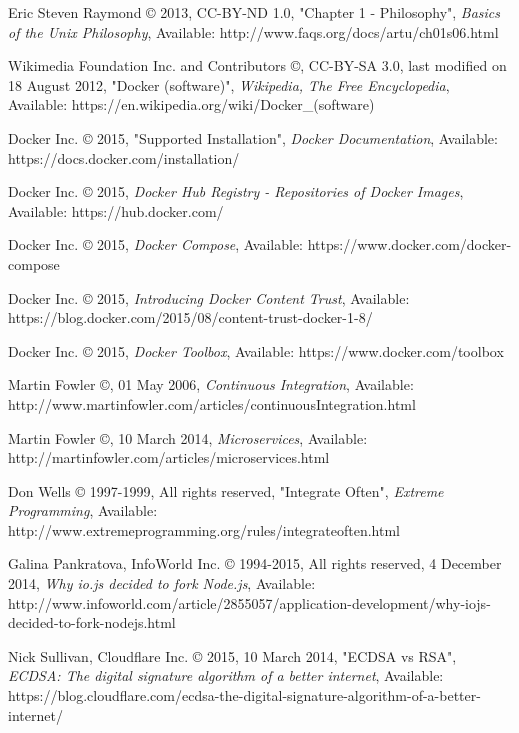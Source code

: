 \begin{thebibliography}{999}

\raggedright
Eric Steven Raymond © 2013, CC-BY-ND 1.0, "Chapter 1 - Philosophy",
{\em Basics of the Unix Philosophy},
Available: http://www.faqs.org/docs/artu/ch01s06.html

\raggedright
Wikimedia Foundation Inc. and Contributors ©, CC-BY-SA 3.0,
last modified on 18 August 2012, "Docker (software)",
{\em Wikipedia, The Free Encyclopedia},
Available: https://en.wikipedia.org/wiki/Docker\_(software)

Docker Inc. © 2015, "Supported Installation",
{\em Docker Documentation},
Available: https://docs.docker.com/installation/

Docker Inc. © 2015,
{\em Docker Hub Registry - Repositories of Docker Images},
Available: https://hub.docker.com/

\raggedright
Docker Inc. © 2015,
{\em Docker Compose},
Available: https://www.docker.com/docker-compose

\raggedright
Docker Inc. © 2015,
{\em Introducing Docker Content Trust},
Available: https://blog.docker.com/2015/08/content-trust-docker-1-8/

\raggedright
Docker Inc. © 2015,
{\em Docker Toolbox},
Available: https://www.docker.com/toolbox

\raggedright
Martin Fowler ©, 01 May 2006,
{\em Continuous Integration},
Available: http://www.martinfowler.com/articles/continuousIntegration.html

\raggedright
Martin Fowler ©, 10 March 2014,
{\em Microservices},
Available: http://martinfowler.com/articles/microservices.html

\raggedright
Don Wells © 1997-1999, All rights reserved, "Integrate Often",
{\em Extreme Programming},
Available: http://www.extremeprogramming.org/rules/integrateoften.html

\raggedright
Galina Pankratova, InfoWorld Inc. © 1994-2015, All rights reserved, 4 December 2014,
{\em Why io.js decided to fork Node.js},
Available: http://www.infoworld.com/article/2855057/application-development/why-iojs-decided-to-fork-nodejs.html

\raggedright
Nick Sullivan, Cloudflare Inc. © 2015, 10 March 2014, "ECDSA vs RSA",
{\em ECDSA: The digital signature algorithm of a better internet},
Available: https://blog.cloudflare.com/ecdsa-the-digital-signature-algorithm-of-a-better-internet/


\end{thebibliography}
